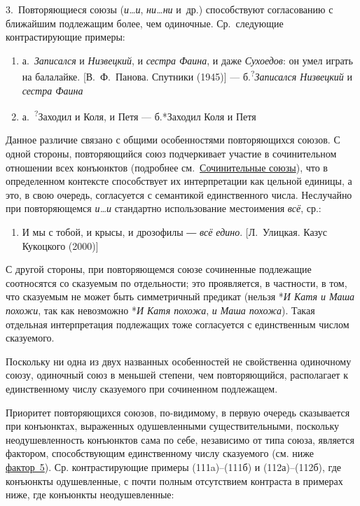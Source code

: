 3.~Повторяющиеся союзы (\textit{и\ldots и}, \textit{ни\ldots ни} и~др.)
способствуют согласованию с ближайшим подлежащим более, чем одиночные.
Ср.~следующие контрастирующие примеры:

\begin{enumerate}
\def\labelenumi{(\arabic{enumi})}
\setcounter{enumi}{110}
\item
  а.~\textit{Записался} и \textit{Низвецкий}, и \textit{сестра Фаина}, и даже
  \textit{Сухоедов}: он умел играть на балалайке. {[}В.~Ф.~Панова.
  Спутники (1945){]} --- б.\textsuperscript{?}\textit{Записался Низвецкий}
  и \textit{сестра Фаина}
\item
  а.~\textsuperscript{?}Заходил и Коля, и Петя --- б.*Заходил Коля и Петя
\end{enumerate}

Данное различие связано с общими особенностями повторяющихся союзов. С
одной стороны, повторяющийся союз подчеркивает участие в сочинительном
отношении всех конъюнктов (подробнее см.~\underline{Сочинительные
союзы}), что в определенном контексте способствует их интерпретации как
цельной единицы, а это, в свою очередь, согласуется с семантикой
единственного числа. Неслучайно при повторяющемся \textit{и\ldots и}
стандартно использование местоимения \textit{всё}, ср.:

\begin{enumerate}
\def\labelenumi{(\arabic{enumi})}
\setcounter{enumi}{112}
\item
  И мы с тобой, и крысы, и дрозофилы ― \textit{всё едино}. {[}Л.~Улицкая.
  Казус Кукоцкого (2000){]}
\end{enumerate}

С другой стороны, при повторяющемся союзе сочиненные подлежащие
соотносятся со сказуемым по отдельности; это проявляется, в частности, в
том, что сказуемым не может быть симметричный предикат (нельзя *\textit{И
Катя и Маша похожи}, так как невозможно *\textit{И Катя похожа}, \textit{и
Маша похожа}). Такая отдельная интерпретация подлежащих тоже согласуется
с единственным числом сказуемого.

Поскольку ни одна из двух названных особенностей не свойственна
одиночному союзу, одиночный союз в меньшей степени, чем повторяющийся,
располагает к единственному числу сказуемого при сочиненном подлежащем.

Приоритет повторяющихся союзов, по-видимому, в первую очередь
сказывается при конъюнктах, выраженных одушевленными существительными,
поскольку неодушевленность конъюнктов сама по себе, независимо от типа
союза, является фактором, способствующим единственному числу сказуемого
(см. ниже \underline{фактор~5}). Ср. контрастирующие примеры
(111a)--(111б) и (112а)--(112б), где конъюнкты одушевленные, с почти
полным отсутствием контраста в примерах ниже, где конъюнкты
неодушевленные:

